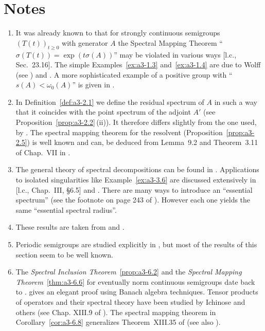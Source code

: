 \section*{Notes}\label{notes:a3-notes}
\begin{enumerate}[label=\emph{Section 3.\arabic*:}, wide, itemsep=1ex]
\item 
It was already known to \textcite{hillephillips:1957} that for strongly continuous semigroups $(T(t))_{t\geq 0}$ with generator $A$ the Spectral Mapping Theorem \enquote{$\sigma(T(t)) = \exp(t\sigma(A))$} may be violated in various ways [l.c., Sec.~23.16].
The simple Examples~\ref{ex:a3-1.3} and~\ref{ex:a3-1.4} are due to Wolff (see \textcite{greinervoigtwolff:1981}) and \textcite{zabczyk:1975}.
A more sophisticated example of a positive group with 
\enquote{$s(A) < \omega_{0}(A)$} is given in \textcite{wolff:1981}.

\item 
In Definition~\ref{def:a3-2.1} we define the residual spectrum of\/ $A$ in such a way that it coincides with the point spectrum of the adjoint $A'$ (see Proposition~\ref{prop:a3-2.2}\,(ii)).
It therefore differs slightly from the one used, \eg by \textcite{schaefer:1974}.
The spectral mapping theorem for the resolvent (Proposition~\ref{prop:a3-2.5}) is well known and can, \eg be deduced from Lemma~9.2 and Theorem~3.11 of Chap.~VII in \textcite{dunfordschwartz:1958}.

\item 
The general theory of spectral decompositions can be found in \textcite[Chap.~III, §6.4]{kato:1976}.
Applications to isolated singularities like Example~\ref{ex:a3-3.6} are discussed extensively in [l.c., Chap.~III, §6.5] and \textcite[Chap.~VIII, Sec.~8]{yosida:1965}.
There are many ways to introduce an \enquote{essential spectrum} (see the footnote on page 243 of \textcite{kato:1976}).
However each one yields the same \enquote{essential spectral radius}.

\item 
These results are taken from \textcite{derndinger:1980} and \textcite{greiner:1981}.

\item 
Periodic semigroups are studied explicitly in \textcite{bart:1977}, but most of the results of this section seem to be well known.

\item
The \emph{Spectral Inclusion Theorem}~\ref{prop:a3-6.2} and the 
\emph{Spectral Mapping Theorem}~\ref{thm:a3-6.6} for eventually norm continuous semigroups date back to \textcite{hillephillips:1957}.
\textcite{davies:1980} gives an elegant proof using Banach algebra techniques.
Tensor products of operators and their spectral theory have been studied by Ichinose and others (see Chap. XIII.9 of \textcite{reedsimon:1978}).
The spectral mapping theorem in Corollary~\ref{cor:a3-6.8} generalizes Theorem~XIII.35 of \textcite{reedsimon:1978} (see also \textcite{herbst:1982}).


\end{enumerate}
